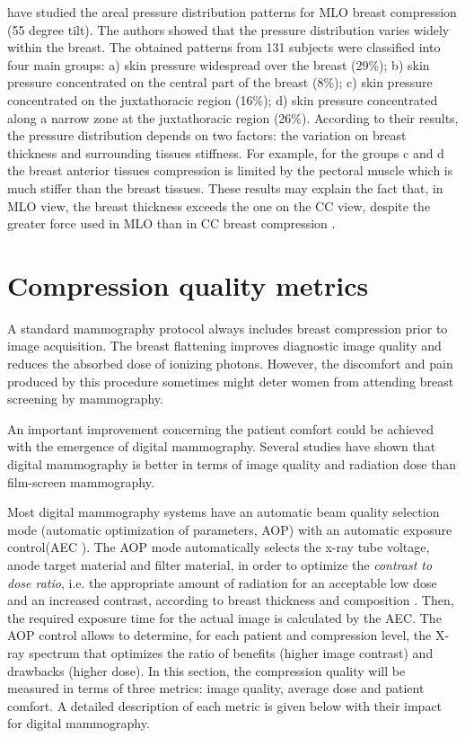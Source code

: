 \cite{dustler_breast_2012} have studied the areal pressure distribution patterns for MLO breast compression (55 degree tilt). The authors showed that the pressure distribution varies widely within the breast. The obtained patterns from 131 subjects were classified into four main groups: a) skin pressure widespread over the breast (29\%); b) skin pressure concentrated on the central part of the breast (8\%); c) skin pressure concentrated on the juxtathoracic region (16\%); d) skin pressure concentrated along a narrow zone at the juxtathoracic region (26\%). According to their results, the pressure distribution depends on two factors: the variation on breast thickness and surrounding tissues stiffness. For example, for the groups c and d the breast anterior tissues compression is limited by the pectoral muscle which is much stiffer than the breast tissues.  These results may explain the fact that, in MLO view, the breast thickness exceeds the one on the CC view, despite the greater force used in MLO than in CC breast compression \citep{mercer_practitioner_2013, helvie_breast_1994}. 

\section{Compression quality metrics}
A standard mammography protocol always includes breast compression prior to image acquisition. The breast flattening improves diagnostic image quality and reduces the absorbed dose of ionizing photons. However, the discomfort and pain produced by this procedure sometimes might deter women from attending breast screening by mammography. 

An important improvement concerning the patient comfort could be achieved with the emergence of digital mammography.  Several studies have shown that digital mammography is better in terms of image quality \citep{obenauer_screen_2002} and radiation dose \citep{chen_analysis_2012} than film-screen mammography.

Most digital mammography systems have an automatic beam quality selection mode (automatic optimization of parameters, AOP) with an automatic exposure control(AEC ). The AOP mode automatically selects the x-ray  tube  voltage,  anode  target  material  and  filter  material, in order to optimize the \textit{contrast to dose ratio}, i.e. the appropriate amount of radiation for an acceptable low dose and an increased contrast, according to breast thickness and composition \citep{williams_optimization_2008}. Then, the required exposure time for the actual image is calculated by the AEC.  The AOP control allows to determine, for each patient and compression level, the X-ray spectrum that optimizes the  ratio of benefits  (higher image contrast) and  drawbacks  (higher  dose). 
In this section, the compression quality will be measured in terms of three metrics: image quality, average dose and patient comfort. A detailed description of each metric is given below with their impact for digital mammography. 

